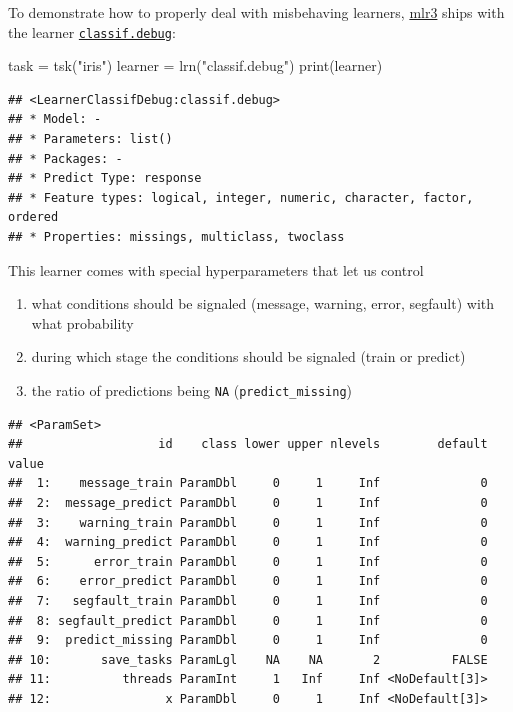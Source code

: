 \documentclass[
]{scrbook}
\newenvironment{Shaded}{\begin{snugshade}}{\end{snugshade}}
\newcommand{\FunctionTok}[1]{\textcolor[rgb]{0.00,0.00,0.00}{#1}}
\newcommand{\NormalTok}[1]{#1}
\newcommand{\OtherTok}[1]{\textcolor[rgb]{0.56,0.35,0.01}{#1}}
\newcommand{\SpecialCharTok}[1]{\textcolor[rgb]{0.00,0.00,0.00}{#1}}
\newcommand{\StringTok}[1]{\textcolor[rgb]{0.31,0.60,0.02}{#1}}
\providecommand{\tightlist}{%
  \setlength{\itemsep}{0pt}\setlength{\parskip}{0pt}}
\renewenvironment{Shaded} {\begin{snugshade}\small} {\end{snugshade}}
\begin{document}
To demonstrate how to properly deal with misbehaving learners, \href{https://mlr3.mlr-org.com}{mlr3} ships with the learner \href{https://mlr3.mlr-org.com/reference/mlr_learners_classif.debug.html}{\texttt{classif.debug}}:

\begin{Shaded}
\begin{Highlighting}[]
\NormalTok{task }\OtherTok{=} \FunctionTok{tsk}\NormalTok{(}\StringTok{"iris"}\NormalTok{)}
\NormalTok{learner }\OtherTok{=} \FunctionTok{lrn}\NormalTok{(}\StringTok{"classif.debug"}\NormalTok{)}
\FunctionTok{print}\NormalTok{(learner)}
\end{Highlighting}
\end{Shaded}

\begin{verbatim}
## <LearnerClassifDebug:classif.debug>
## * Model: -
## * Parameters: list()
## * Packages: -
## * Predict Type: response
## * Feature types: logical, integer, numeric, character, factor, ordered
## * Properties: missings, multiclass, twoclass
\end{verbatim}

This learner comes with special hyperparameters that let us control

\begin{enumerate}
\def\labelenumi{\arabic{enumi}.}
\tightlist
\item
  what conditions should be signaled (message, warning, error, segfault) with what probability
\item
  during which stage the conditions should be signaled (train or predict)
\item
  the ratio of predictions being \texttt{NA} (\texttt{predict\_missing})
\end{enumerate}

\begin{Shaded}
\end{Shaded}

\begin{verbatim}
## <ParamSet>
##                   id    class lower upper nlevels        default value
##  1:    message_train ParamDbl     0     1     Inf              0      
##  2:  message_predict ParamDbl     0     1     Inf              0      
##  3:    warning_train ParamDbl     0     1     Inf              0      
##  4:  warning_predict ParamDbl     0     1     Inf              0      
##  5:      error_train ParamDbl     0     1     Inf              0      
##  6:    error_predict ParamDbl     0     1     Inf              0      
##  7:   segfault_train ParamDbl     0     1     Inf              0      
##  8: segfault_predict ParamDbl     0     1     Inf              0      
##  9:  predict_missing ParamDbl     0     1     Inf              0      
## 10:       save_tasks ParamLgl    NA    NA       2          FALSE      
## 11:          threads ParamInt     1   Inf     Inf <NoDefault[3]>      
## 12:                x ParamDbl     0     1     Inf <NoDefault[3]>
\end{verbatim}
\end{document}
